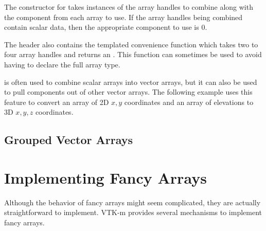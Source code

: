 The constructor for  takes
instances of the array handles to combine along with the component from
each array to use. If the array handles being combined contain scalar data,
then the appropriate component to use is 0.


The  header also
contains the templated convenience function
 which takes two to four array
handles and returns an . This
function can sometimes be used to avoid having to declare the full array
type.


 is often used to combine scalar
arrays into vector arrays, but it can also be used to pull components out
of other vector arrays. The following example uses this feature to convert
an array of 2D $x,y$ coordinates and an array of elevations to 3D $x,y,z$
coordinates.



\subsection{Grouped Vector Arrays}
\label{sec:GroupedVectorArrays}





\section{Implementing Fancy Arrays}
\label{sec:ImplementingFancyArrays}

Although the behavior of fancy arrays might seem complicated, they are
actually straightforward to implement. VTK-m provides several mechanisms to
implement fancy arrays.

